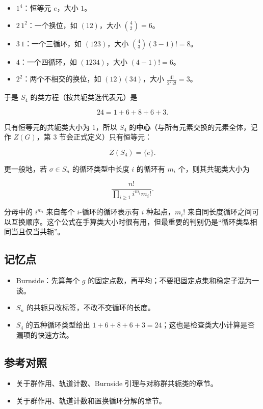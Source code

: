 \begin{itemize}
\item $1^4$：恒等元 $e$，大小 $1$。
\item $2\,1^2$：一个换位，如 $(12)$，大小 $\binom42=6$。
\item $3\,1$：一个三循环，如 $(123)$，大小 $\binom43(3-1)!=8$。
\item $4$：一个四循环，如 $(1234)$，大小 $(4-1)!=6$。
\item $2^2$：两个不相交的换位，如 $(12)(34)$，大小 $\frac{4!}{2^2\,2!}=3$。
\end{itemize}


于是 $S_4$ 的类方程（按共轭类选代表元）是

\[
24=1+6+8+6+3.
\]

只有恒等元的共轭类大小为 $1$，所以 $S_4$ 的\textbf{中心}（与所有元素交换的元素全体，记作 $Z(G)$，第 3 节会正式定义）只有恒等元：

\[
Z(S_4)=\{e\}.
\]

更一般地，若 $\sigma\in S_n$ 的循环类型中长度 $i$ 的循环有 $m_i$ 个，则其共轭类大小为

\[
\frac{n!}{\prod_{i\ge1} i^{m_i}m_i!}.
\]

分母中的 $i^{m_i}$ 来自每个 $i$-循环的循环表示有 $i$ 种起点，$m_i!$ 来自同长度循环之间可以互换顺序。这个公式在手算类大小时很有用，但最重要的判别仍是“循环类型相同当且仅当共轭”。

\subsection{记忆点}


\begin{itemize}
\item Burnside：先算每个 $g$ 的固定点数，再平均；不要把固定点集和稳定子混为一谈。
\item $S_n$ 的共轭只改标签，不改不交循环的长度。
\item $S_4$ 的五种循环类型给出 $1+6+8+6+3=24$；这也是检查类大小计算是否漏项的快速方法。
\end{itemize}


\subsection{参考对照}


\begin{itemize}
\item [DF] 关于群作用、轨道计数、Burnside 引理与对称群共轭类的章节。
\item [DS] 关于群作用、轨道计数和置换循环分解的章节。
\end{itemize}
